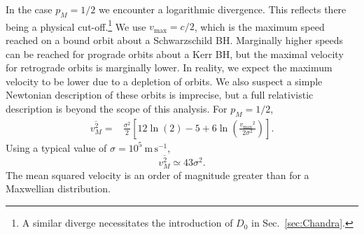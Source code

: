 \documentclass[useAMS,usedcolumn,usegraphicx,usenatbib]{mn2e}
\newcommand{\secref}[1]{Sec.~\ref{sec:#1}}
\newcommand{\units}[1]{\ensuremath{~\mathrm{#1}}}
\newcommand{\sub}[1]{\ensuremath{_\mathrm{#1}}}
\begin{document}
\begin{onecolumn}
In the case $p_M = 1/2$ we encounter a logarithmic divergence. This reflects there being a physical cut-off.\footnote{A similar diverge necessitates the introduction of $D_0$ in \secref{Chandra}.} We use $v\sub{max} = c/2$, which is the maximum speed reached on a bound orbit about a Schwarzschild BH. Marginally higher speeds can be reached for prograde orbits about a Kerr BH, but the maximal velocity for retrograde orbits is marginally lower. In reality, we expect the maximum velocity to be lower due to a depletion of orbits. We also suspect a simple Newtonian description of these orbits is imprecise, but a full relativistic description is beyond the scope of this analysis. For $p_M = 1/2$,
\begin{align}
\overline{v^2_{M}} = {} & \frac{\sigma^2}{2}\left[12\ln(2) - 5 + 6 \ln\left(\frac{v\sub{max}^2}{2\sigma^2}\right)\right].
\end{align}
Using a typical value of $\sigma = 10^5\units{m\,s^{-1}}$,
\begin{equation}
\overline{v^2_{M}} \simeq 43\sigma^2.
\end{equation}
The mean squared velocity is an order of magnitude greater than for a Maxwellian distribution.


\end{onecolumn}
\end{document}
